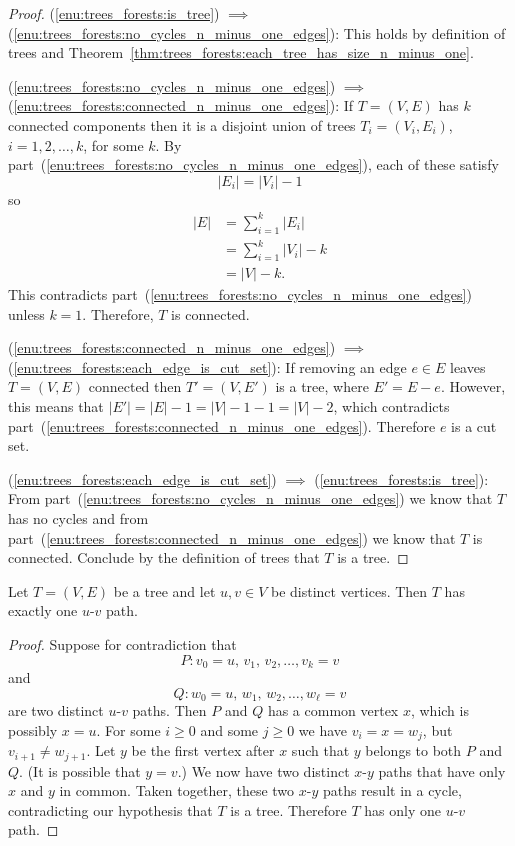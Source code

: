 \begin{proof}
(\ref{enu:trees_forests:is_tree}) $\implies$
  (\ref{enu:trees_forests:no_cycles_n_minus_one_edges}):
This holds by definition of trees and
Theorem~\ref{thm:trees_forests:each_tree_has_size_n_minus_one}.

(\ref{enu:trees_forests:no_cycles_n_minus_one_edges}) $\implies$
(\ref{enu:trees_forests:connected_n_minus_one_edges}):
If $T = (V,E)$ has $k$ connected components then it is a disjoint
union of trees $T_i = (V_i, E_i)$, $i = 1, 2, \dots, k$, for some
$k$. By part~(\ref{enu:trees_forests:no_cycles_n_minus_one_edges}),
each of these satisfy
\[
|E_i|
=
|V_i| - 1
\]
so
\begin{align*}
|E|
&=
\sum_{i=1}^k |E_i| \\[4pt]
&=
\sum_{i=1}^k |V_i| - k \\[4pt]
&=
|V| - k.
\end{align*}
This contradicts
part~(\ref{enu:trees_forests:no_cycles_n_minus_one_edges}) unless
$k = 1$. Therefore, $T$ is connected.

(\ref{enu:trees_forests:connected_n_minus_one_edges}) $\implies$
(\ref{enu:trees_forests:each_edge_is_cut_set}):
If removing an edge $e \in E$ leaves $T = (V,E)$ connected then
$T' = (V, E')$ is a tree, where $E' = E - e$. However, this means that
$|E'| = |E| - 1 = |V| - 1 - 1 = |V| - 2$, which contradicts
part~(\ref{enu:trees_forests:connected_n_minus_one_edges}). Therefore
$e$ is a cut set.

(\ref{enu:trees_forests:each_edge_is_cut_set}) $\implies$
(\ref{enu:trees_forests:is_tree}):
From part~(\ref{enu:trees_forests:no_cycles_n_minus_one_edges}) we
know that $T$ has no cycles and from
part~(\ref{enu:trees_forests:connected_n_minus_one_edges}) we know
that $T$ is connected. Conclude by the definition of trees that $T$ is
a tree.
\end{proof}

\begin{theorem}
\label{thm:trees_forests:tree_has_one_u_v_path}
Let $T = (V,E)$ be a tree and let $u,v \in V$ be distinct
vertices. Then $T$ has exactly one $u$-$v$ path.
\end{theorem}

\begin{proof}
Suppose for contradiction that
\[
P : v_0 = u,\, v_1,\, v_2, \dots, v_k = v
\]
and
\[
Q : w_0 = u,\, w_1,\, w_2, \dots, w_\ell = v
\]
are two distinct $u$-$v$ paths. Then $P$ and $Q$ has a common vertex
$x$, which is possibly $x = u$. For some $i \geq 0$ and some
$j \geq 0$ we have $v_i = x = w_j$, but $v_{i+1} \neq w_{j+1}$. Let
$y$ be the first vertex after $x$ such that $y$ belongs to both $P$
and $Q$. (It is possible that $y = v$.) We now have two distinct
$x$-$y$ paths that have only $x$ and $y$ in common. Taken together,
these two $x$-$y$ paths result in a cycle, contradicting our
hypothesis that $T$ is a tree. Therefore $T$ has only one $u$-$v$ path.
\end{proof}

